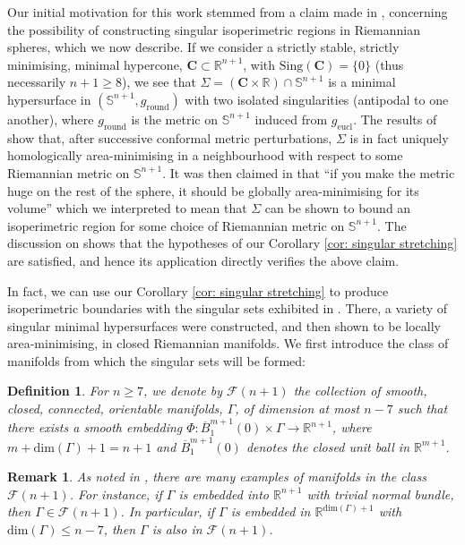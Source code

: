 \documentclass[12pt]{article}
\newtheorem{definition}{Definition}
\newtheorem{remark}{Remark}
\begin{document}
Our initial motivation for this work stemmed from a claim made in \cite{M16}, concerning the possibility of constructing singular isoperimetric regions in Riemannian spheres, which we now describe. If we consider a strictly stable, strictly minimising, minimal hypercone, $\mathbf{C} \subset \mathbb{R}^{n+1}$, with $\mathrm{Sing}(\mathbf{C}) = \{0\}$ (thus necessarily $n + 1\geq 8$), we see that  $\Sigma = (\mathbf{C} \times \mathbb{R}) \cap \mathbb{S}^{n+1}$ is a minimal hypersurface in $(\mathbb{S}^{n+1},g_{\mathrm{round}})$ with two isolated singularities (antipodal to one another), where $g_\mathrm{round}$ is the metric on $\mathbb{S}^{n+1}$ induced from $g_\mathrm{eucl}$. The results of \cite[Section 3]{S99} show that, after successive conformal metric perturbations, $\Sigma$ is in fact uniquely homologically area-minimising in a neighbourhood with respect to some Riemannian metric on $\mathbb{S}^{n+1}$. It was then claimed in \cite[Section 13.2]{M16} that ``if you make
the metric huge on the rest of the sphere, it should be globally area-minimising for its volume'' which we interpreted to mean that $\Sigma$ can be shown to bound an isoperimetric region for some choice of Riemannian metric on $\mathbb{S}^{n+1}$. The discussion on \cite[Pages 168-169]{S99} shows that the hypotheses of our Corollary \ref{cor: singular stretching} are satisfied, and hence its application directly verifies the above claim.

\bigskip

In fact, we can use our Corollary \ref{cor: singular stretching} to produce isoperimetric boundaries with the singular sets exhibited in \cite{S00}. There, a variety of singular minimal hypersurfaces were constructed, and then shown to be locally area-minimising, in closed Riemannian manifolds. We first introduce the class of manifolds from which the singular sets will be formed:

\begin{definition}
    For $n\ge 7$, we denote by $\mathcal{F}(n+1)$ the collection of smooth, closed, connected, orientable manifolds, $\Gamma$, of dimension at most $n - 7$ such that there exists a smooth embedding $\Phi: \overline{B}^{m+1}_1(0) \times \Gamma \to \mathbb{R}^{n+1}$, where $m + \mathrm{dim}( \Gamma) + 1 = n + 1$ and $\overline{B}^{m+1}_1(0)$ denotes the closed unit ball in $\mathbb{R}^{m+1}$.
\end{definition}
\begin{remark}
    As noted in \cite{S00}, there are many examples of manifolds in the class $\mathcal{F}(n+1)$. For instance, if $\Gamma $ is embedded into $\mathbb{R}^{n+1}$ with trivial normal bundle, then $\Gamma \in \mathcal{F}(n+1)$. In particular, if $\Gamma$ is embedded in $\mathbb{R}^{\mathrm{dim} (\Gamma) +1}$ with $\mathrm{dim}(\Gamma)\le n-7$, then $\Gamma $ is also in $\mathcal{F}(n+1)$.
\end{remark}
\end{document}
